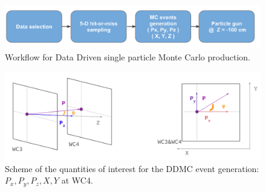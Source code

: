 \begin{figure}[hpbt]
\centering
\includegraphics[width=\textwidth]{Chapter-5/Images/DDMCScheme.png}
\caption{Workflow for Data Driven single particle Monte Carlo production.}
\label{fig:DDMCSketch}
\end{figure}


\begin{figure}[hpbt]
\centering
\includegraphics[width=\textwidth]{Chapter-5/Images/DDMCQuantities.png}
\caption{Scheme of the quantities of interest for the DDMC event generation: $P_x, P_y, P_z, X, Y$ at WC4.}
\label{fig:DDMCQuantities}
\end{figure}


